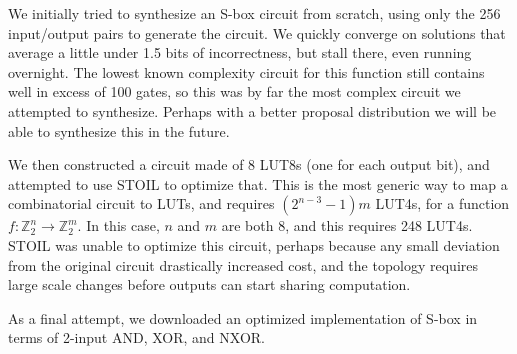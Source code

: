\documentclass{article}
\newcommand{\Z}{\mathbb{Z}}
\begin{document}
We initially tried to synthesize an S-box circuit from scratch, using only the 256 input/output pairs to generate the circuit. We quickly converge on solutions that average a little under 1.5 bits of incorrectness, but stall there, even running overnight. The lowest known complexity circuit for this function still contains well in excess of 100 gates, so this was by far the most complex circuit we attempted to synthesize. Perhaps with a better proposal distribution we will be able to synthesize this in the future.

We then constructed a circuit made of 8 LUT8s (one for each output bit), and attempted to use STOIL to optimize that. This is the most generic way to map a combinatorial circuit to LUTs, and requires $(2^{n-3}-1)m$ LUT4s, for a function $f : \Z_2^n \rightarrow \Z_2^m$. In this case, $n$ and $m$ are both 8, and this requires 248 LUT4s. STOIL was unable to optimize this circuit, perhaps because any small deviation from the original circuit drastically increased cost, and the topology requires large scale changes before outputs can start sharing computation.

As a final attempt, we downloaded an optimized implementation of S-box in terms of 2-input AND, XOR, and NXOR.
\end{document}
